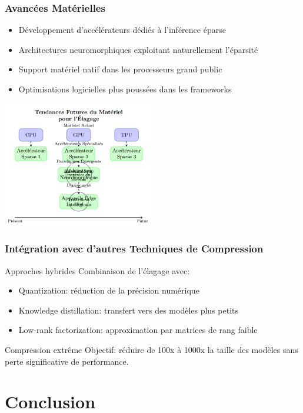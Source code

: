 \documentclass[10pt]{beamer}
\begin{document}
\begin{frame}
\frametitle{Avancées Matérielles}
\begin{itemize}
    \item Développement d'accélérateurs dédiés à l'inférence éparse
    \item Architectures neuromorphiques exploitant naturellement l'éparsité
    \item Support matériel natif dans les processeurs grand public
    \item Optimisations logicielles plus poussées dans les frameworks
\end{itemize}

\begin{center}
\includegraphics[width=0.5\textwidth]{future_hardware.jpg}
\end{center}
\end{frame}

\begin{frame}
\frametitle{Intégration avec d'autres Techniques de Compression}
\begin{block}{Approches hybrides}
Combinaison de l'élagage avec:
\begin{itemize}
    \item Quantization: réduction de la précision numérique
    \item Knowledge distillation: transfert vers des modèles plus petits
    \item Low-rank factorization: approximation par matrices de rang faible
\end{itemize}
\end{block}

\begin{exampleblock}{Compression extrême}
Objectif: réduire de 100x à 1000x la taille des modèles sans perte significative de performance.
\end{exampleblock}
\end{frame}

\section{Conclusion}
\end{document}
